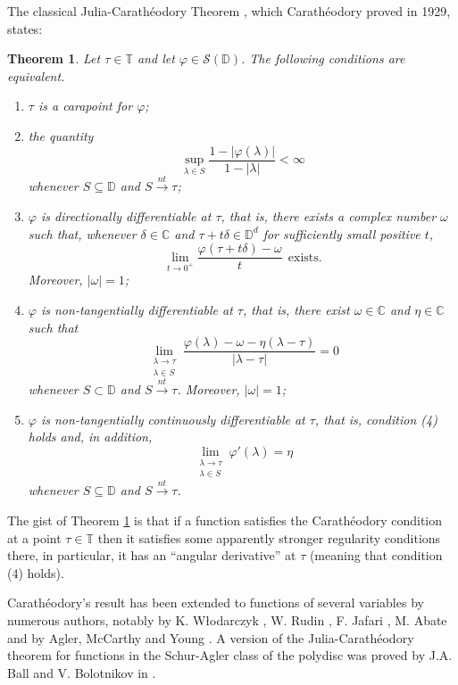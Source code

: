 \documentclass[11pt, reqno]{amsart}
\newtheorem{theorem}{Theorem}[section]
\newcommand\1{\boldsymbol {1}}
\newcommand{\T}{\mathbb{T}}
\newcommand{\C}{\mathbb{C}}
\numberwithin{equation}{section}
\begin{document}
The classical Julia-Carath\'{e}odory Theorem \cite{caratheodory}, which Carath\'eodory proved in 1929, states:
\begin{theorem}\label{caratheodedorytheorem}
    Let $\tau\in\mathbb{T}$ and let $\varphi\in\mathcal{S}(\mathbb{D})$. The following conditions are equivalent.
    \begin{enumerate}
        \item $\tau$ is a carapoint for $\varphi$;
          \item the quantity
        $$\sup_{\lambda\in S}\dfrac{1-\lvert \varphi(\lambda)\rvert}{1-\lvert\lambda\rvert}<\infty$$
        whenever $S\subseteq \mathbb{D}$ and $S{\overset{nt}\rightarrow}\tau$;
        \item $\varphi$ is directionally differentiable at $\tau$, that is, 
          there exists a complex number $\omega$ such that,
     whenever $\delta \in \C$ and
        $\tau+t\delta\in\mathbb{D}^{d}$ for sufficiently small positive $t$, 
$$\lim_{t\rightarrow 0^{+}} \dfrac{\varphi(\tau+t\delta)-\omega}{t}~~{\text{exists}}.$$
Moreover,  $|\omega|=1$;
        \item $\varphi$ is non-tangentially differentiable at $\tau$, that is, there exist $\omega\in\mathbb{C}$  and $\eta\in\mathbb{C}$ such that
$$\lim_{\substack{\lambda\rightarrow \tau \\ \lambda\in S}}\dfrac{\varphi(\lambda)-\omega-\eta (\lambda-\tau)}{\lvert\lambda-\tau\rvert}=0$$
whenever $S\subset \mathbb{D}$ and $S{\overset{nt}\rightarrow}\tau$. Moreover, $|\omega|=1$;
        \item $\varphi$ is non-tangentially continuously differentiable at $\tau$, that is, condition 
        {\rm (4)} holds and, in addition, 
        $$\lim_{\substack{\lambda\rightarrow \tau \\ \lambda\in S}}\varphi'(\lambda)=\eta$$
whenever $S\subseteq \mathbb{D}$ and $S{\overset{nt}\rightarrow}\tau$.
        \end{enumerate}
\end{theorem}
The gist of Theorem \ref{caratheodedorytheorem} is
that if a function satisfies the Carath\'{e}odory condition at a point $\tau \in \T$ then it satisfies some apparently stronger regularity conditions there, in particular, it has an “angular derivative” at $\tau$ (meaning that condition (4) holds). 

Carath\'eodory's result has been extended to functions of several variables by numerous authors, notably by K. W\l odarczyk \cite{woody}, W. Rudin \cite{rudin}, F. Jafari \cite{jaf93},  M. Abate \cite{Abate} and by Agler, McCarthy and Young \cite{AMYcara}. A version of the Julia-Carath\'eodory theorem for functions in the Schur-Agler class of the polydisc was proved by J.A. Ball and V. Bolotnikov in \cite[Lemma 2.1]{BallandBolot1}.
\end{document}
